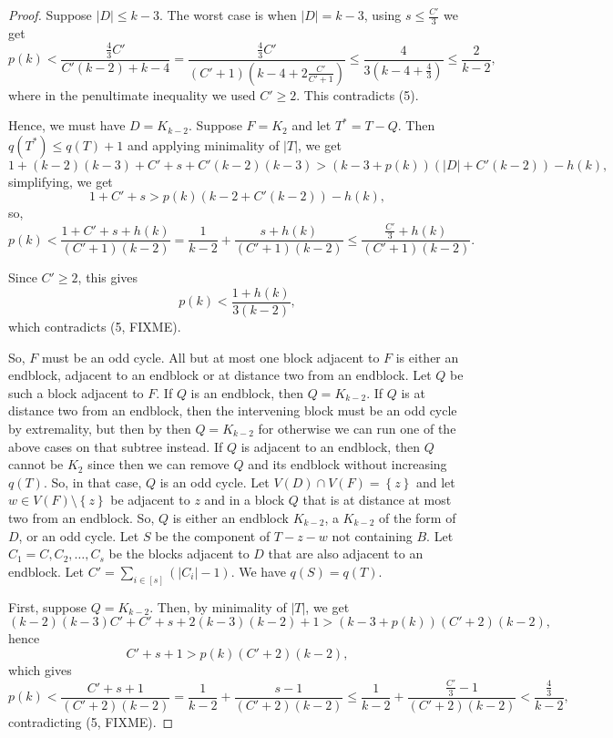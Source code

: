 \documentclass[12pt]{article}
\theoremstyle{plain}
\theoremstyle{definition}
\theoremstyle{remark}
\newcommand{\set}[1]{\left\{ #1 \right\}}
\newcommand{\card}[1]{\left|#1\right|}
\newcommand{\irange}[1]{\left[#1\right]}
\newcommand{\parens}[1]{\left( #1 \right)}
\begin{document}
\begin{proof}
		 Suppose $|D| \le k-3$.  The worst case is when $|D| = k-3$, using $s \le \frac{C'}{3}$ we get
		 \[p(k) < \frac{\frac43 C'}{C'(k-2) + k-4} = \frac{\frac43 C'}{\parens{C' + 1}\parens{k-4 + 2\frac{C'}{C'+1}}} \le \frac{4}{3(k-4 + \frac43)} \le \frac{2}{k-2},\]
		 where in the penultimate inequality we used $C' \ge 2$.  This contradicts (5).
		 
		 Hence, we must have $D = K_{k-2}$.  Suppose $F = K_2$ and let $T^*= T - Q$.  Then $q(T^*) \le q(T) + 1$ and applying minimality of $|T|$, we get
		 \[1 + (k-2)(k-3) + C' + s + C'(k-2)(k-3) > (k-3 + p(k))(\card{D} + C'(k-2)) - h(k) ,\]
		 simplifying, we get
		 \[1 + C' + s > p(k)(k-2 + C'(k-2)) - h(k) ,\]
		 so,
		 \[p(k) < \frac{1 + C' + s + h(k)}{(C' + 1)(k-2)} = \frac{1}{k-2} + \frac{s + h(k)}{(C' + 1)(k-2)} \le \frac{\frac{C'}{3} + h(k)}{(C' + 1)(k-2)}.\]
		 
		 Since $C' \ge 2$, this gives
		 \[p(k) < \frac{1 + h(k)}{3(k-2)},\]
		 which contradicts (5, FIXME).  
		 
		 So, $F$ must be an odd cycle.  All but at most one block adjacent to $F$ is either an endblock, adjacent to an endblock or at distance two from an endblock.  Let $Q$ be such a block adjacent to $F$.  If $Q$ is an endblock, then $Q=K_{k-2}$.  If $Q$ is at distance two from an endblock, then the intervening block must be an odd cycle by extremality, but then by then $Q = K_{k-2}$ for otherwise we can run one of the above cases on that subtree instead. If $Q$ is adjacent to an endblock, then $Q$ cannot be $K_2$ since then we can remove $Q$ and its endblock without increasing $q(T)$.  So, in that case, $Q$ is an odd cycle. Let $V(D) \cap V(F) = \set{z}$ and let $w \in V(F) \setminus \set{z}$ be adjacent to $z$ and in a block $Q$ that is at distance at most two from an endblock.  So, $Q$ is either an endblock $K_{k-2}$, a $K_{k-2}$ of the form of $D$, or an odd cycle.  Let $S$ be the component of $T - z - w$ not containing $B$.   Let $C_1 = C, C_2, \ldots, C_s$ be the blocks adjacent to $D$ that are also adjacent to an endblock.  Let $C' = \sum_{i \in \irange{s}} \parens{\card{C_i} - 1}$. We have $q(S) = q(T)$. 
		 
		 First, suppose $Q = K_{k-2}$. Then, by minimality of $\card{T}$, we get
		 \[(k-2)(k-3)C' + C' + s + 2(k-3)(k-2) + 1 > (k-3 + p(k))(C'+2)(k-2),\]
		 hence
		 \[C' + s + 1 > p(k)(C'+2)(k-2),\]
		 which gives
		 \[p(k) < \frac{C' + s + 1}{(C'+2)(k-2)} = \frac{1}{k-2} + \frac{s-1}{(C'+2)(k-2)} \le \frac{1}{k-2} + \frac{\frac{C'}{3} - 1}{(C'+2)(k-2)} < \frac{\frac43}{k-2},\]
		 contradicting (5, FIXME).
		 

\end{proof}
\end{document}
